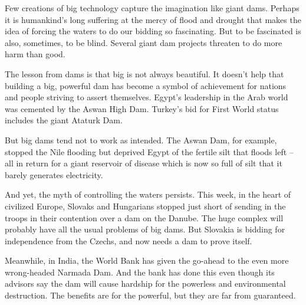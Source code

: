\documentclass[a4paper]{article}
\begin{document}
\par
Few creations of big technology capture the imagination like giant dams. Perhaps it is humankind’s long suffering at the mercy of flood and drought that makes the idea of forcing the waters to do our bidding so fascinating. But to be fascinated is also, sometimes, to be blind. Several giant dam projects threaten to do more harm than good.

\par
The lesson from dams is that big is not always beautiful. It doesn’t help that building a big, powerful dam has become a symbol of achievement for nations and people striving to assert themselves. Egypt’s leadership in the Arab world was cemented by the Aswan High Dam. Turkey’s bid for First World status includes the giant Ataturk Dam.

\par
But big dams tend not to work as intended. The Aswan Dam, for example, stopped the Nile flooding but deprived Egypt of the fertile silt that floods left -- all in return for a giant reservoir of disease which is now so full of silt that it barely generates electricity.

\par
And yet, the myth of controlling the waters persists. This week, in the heart of civilized Europe, Slovaks and Hungarians stopped just short of sending in the troops in their contention over a dam on the Danube. The huge complex will probably have all the usual problems of big dams. But Slovakia is bidding for independence from the Czechs, and now needs a dam to prove itself.

\par
Meanwhile, in India, the World Bank has given the go-ahead to the even more wrong-headed Narmada Dam. And the bank has done this even though its advisors say the dam will cause hardship for the powerless and environmental destruction. The benefits are for the powerful, but they are far from guaranteed.
\end{document}
